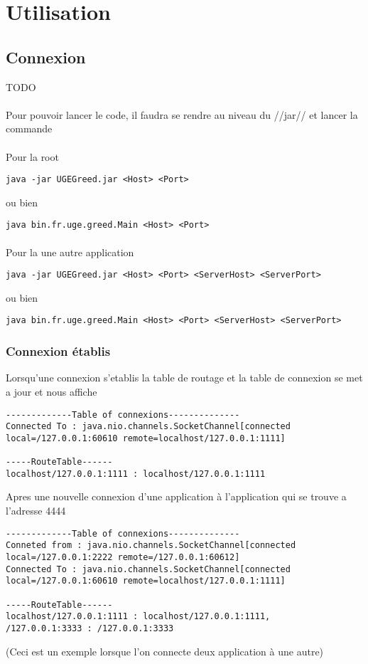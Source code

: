 \documentclass[a4paper,titlepage]{report}
\begin{document}
\section{Utilisation}
\subsection{Connexion}
TODO
\paragraph{}
Pour pouvoir lancer le code, il faudra se rendre au niveau du //jar// et lancer la commande 
\paragraph{}

Pour la root
\begin{lstlisting}
java -jar UGEGreed.jar <Host> <Port>
\end{lstlisting}
ou bien
\begin{lstlisting}
java bin.fr.uge.greed.Main <Host> <Port>
\end{lstlisting}
\paragraph{}
Pour la une autre application
\begin{lstlisting}
java -jar UGEGreed.jar <Host> <Port> <ServerHost> <ServerPort>
\end{lstlisting}
ou bien
\begin{lstlisting}
java bin.fr.uge.greed.Main <Host> <Port> <ServerHost> <ServerPort>
\end{lstlisting}
\subsubsection{Connexion établis}
Lorsqu'une connexion s'etablis la table de routage et la table de connexion se met a jour et nous affiche
\begin{lstlisting}
-------------Table of connexions--------------
Connected To : java.nio.channels.SocketChannel[connected local=/127.0.0.1:60610 remote=localhost/127.0.0.1:1111]

-----RouteTable------
localhost/127.0.0.1:1111 : localhost/127.0.0.1:1111
\end{lstlisting}
Apres une nouvelle connexion d'une application à l'application qui se trouve a l'adresse 4444
\begin{lstlisting}
-------------Table of connexions--------------
Conneted from : java.nio.channels.SocketChannel[connected local=/127.0.0.1:2222 remote=/127.0.0.1:60612]
Connected To : java.nio.channels.SocketChannel[connected local=/127.0.0.1:60610 remote=localhost/127.0.0.1:1111]

-----RouteTable------
localhost/127.0.0.1:1111 : localhost/127.0.0.1:1111,
/127.0.0.1:3333 : /127.0.0.1:3333
\end{lstlisting}
(Ceci est un exemple lorsque l'on connecte deux application à une autre)
\end{document}

